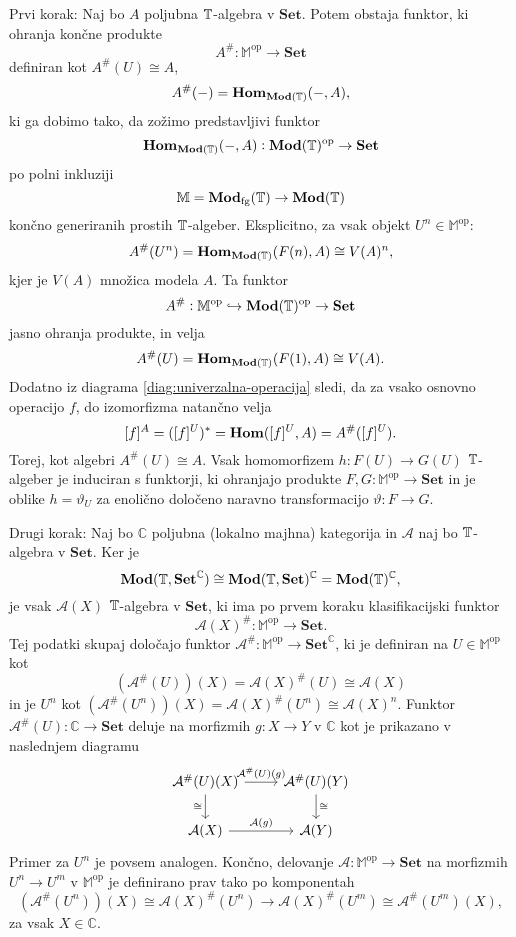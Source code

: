 \documentclass[../kategoricna_logika.tex]{subfiles}
\begin{document}
\begin{dokaz}
  Prvi korak: Naj bo $A$ poljubna $\mathbb{T}$-algebra v $\mathbf{Set}$. Potem obstaja funktor,
  ki ohranja končne produkte
  \[ A^{\#}: \mathbb{M}^{\mathrm{op}} \to \mathbf{Set}\]
  definiran kot $A^{\#}(U) \cong A$,
  \[ A^{\#}(-) = \mathbf{Hom}_{\mathbf{Mod}(\mathbb{T})}(-,A),\]
  ki ga dobimo tako, da zožimo predstavljivi funktor
  \[ \mathbf{Hom}_{\mathbf{Mod}(\mathbb{T})}(-,A) : \mathbf{Mod}(\mathbb{T})^{\mathrm{op}} \to \mathbf{Set}\]
  po polni inkluziji
  \[ \mathbb{M} = \mathbf{Mod}_{\mathrm{fg}}(\mathbb{T}) \to \mathbf{Mod}(\mathbb{T})\]
  končno generiranih prostih $\mathbb{T}$-algeber. Eksplicitno, za vsak objekt
  $U^n \in \mathbb{M}^{\mathrm{op}}$:
  \[ A^{\#}(U^n) = \mathbf{Hom}_{\mathbf{Mod}(\mathbb{T})}(F(n), A) \cong V(A)^{n}, \]
  kjer je $V(A)$ množica modela $A$. Ta funktor
  \[ A^{\#} : \mathbb{M}^{\mathrm{op}} \hookrightarrow \mathbf{Mod}(\mathbb{T})^{\mathrm{op}} \to \mathbf{Set}\]
  jasno ohranja produkte, in velja
  \[ A^{\#}(U) = \mathbf{Hom}_{\mathbf{Mod}(\mathbb{T})}(F(1), A) \cong V(A).\]
  Dodatno iz diagrama \eqref{diag:univerzalna-operacija} sledi, da za vsako osnovno operacijo $f$,
  do izomorfizma natančno velja
  \[ [f]^A = ([f]^U)^{*} = \mathbf{Hom}([f]^U,A) = A^{\#}([f]^U).\]
  Torej, kot algebri $A^{\#}(U) \cong A$. Vsak homomorfizem $h : F(U) \to G(U)$ $\mathbb{T}$-algeber
  je induciran s funktorji, ki ohranjajo produkte $F,G : \mathbb{M}^{\mathrm{op}} \to \mathbf{Set}$
  in je oblike $h = \vartheta_U$ za enolično določeno naravno transformacijo $\vartheta : F \to G$.

  Drugi korak: Naj bo $\mathbb{C}$ poljubna (lokalno majhna) kategorija in $\mathcal{A}$ naj bo
  $\mathbb{T}$-algebra v $\mathbf{Set}$. Ker je
  \[ \mathbf{Mod}(\mathbb{T}, \mathbf{Set}^{\mathbb{C}}) \cong
    \mathbf{Mod}(\mathbb{T}, \mathbf{Set})^{\mathbb{C}} = \mathbf{Mod}(\mathbb{T})^{\mathbb{C}},\]
  je vsak $\mathcal{A}(X)$ $\mathbb{T}$-algebra v $\mathbf{Set}$,
  ki ima po prvem koraku klasifikacijski funktor
  \[ \mathcal{A}(X)^{\#} : \mathbb{M}^{\mathrm{op}} \to \mathbf{Set}.\]
  Tej podatki skupaj določajo funktor
  $\mathcal{A}^{\#} : \mathbb{M}^{\mathrm{op}} \to \mathbf{Set}^{\mathbb{C}}$,
  ki je definiran na $U \in \mathbb{M}^{\mathrm{op}}$ kot
  \[ (\mathcal{A}^{\#}(U))(X) = \mathcal{A}(X)^{\#}(U) \cong \mathcal{A}(X)\]
  in je $U^n$ kot $(\mathcal{A}^{\#}(U^{n}))(X) = \mathcal{A}(X)^{\#}(U^n) \cong \mathcal{A}(X)^n$.
  Funktor $\mathcal{A}^{\#}(U) : \mathbb{C} \to \mathbf{Set}$ deluje na morfizmih $g : X \to Y$ v
  $\mathbb{C}$ kot je prikazano v naslednjem diagramu
  \begin{equation*}
    \begin{tikzcd}
      \mathcal{A}^{\#}(U)(X) \ar[d, "\cong"'] \ar[r, "{\mathcal{A}^{\#}(U)(g)}"] &
      \mathcal{A}^{\#}(U)(Y) \ar[d, "\cong"] \\
      \mathcal{A}(X) \ar[r, "{\mathcal{A}(g)}"] & \mathcal{A}(Y)
    \end{tikzcd}
  \end{equation*}
  Primer za $U^n$ je povsem analogen. Končno, delovanje
  $\mathcal{A} : \mathbb{M}^{\mathrm{op}} \to \mathbf{Set}$ na morfizmih $U^n \to U^m$
  v $\mathbb{M}^{\mathrm{op}}$ je definirano prav tako po komponentah
  \[ (\mathcal{A}^{\#}(U^n))(X) \cong \mathcal{A}(X)^{\#}(U^n) \to
    \mathcal{A}(X)^{\#}(U^m) \cong \mathcal{A}^{\#}(U^m)(X),\]
  za vsak $X \in \mathbb{C}$.


\end{dokaz}
\end{document}
